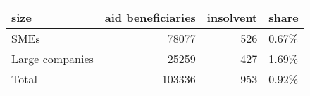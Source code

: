 \begin{tabular}{lrrl}
\toprule
           size &  aid beneficiaries &  insolvent & share \\
\midrule
           SMEs &              78077 &        526 & 0.67\% \\
Large companies &              25259 &        427 & 1.69\% \\
          Total &             103336 &        953 & 0.92\% \\
\bottomrule
\end{tabular}
